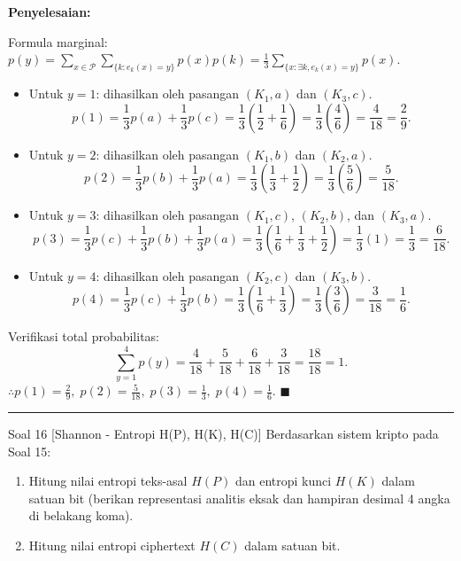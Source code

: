 \documentclass[11pt,a4paper]{article}
\newenvironment{solusi}{\noindent\textbf{\textsf{Penyelesaian:}}\par\vspace{0.2em}}{\hfill$\blacksquare$\vspace{1em}\par\hrule\vspace{1em}}
\begin{document}
\begin{solusi}
Formula marginal: $p(y) = \sum_{x \in \mathcal{P}} \sum_{\{k : e_k(x) = y\}} p(x) p(k) = \frac{1}{3} \sum_{\{x : \exists k, e_k(x)=y\}} p(x)$.
\begin{itemize}[leftmargin=*]
    \item Untuk $y = 1$: dihasilkan oleh pasangan $(K_1, a)$ dan $(K_3, c)$.
    \[
    p(1) = \frac{1}{3} p(a) + \frac{1}{3} p(c) = \frac{1}{3}\left(\frac{1}{2} + \frac{1}{6}\right) = \frac{1}{3}\left(\frac{4}{6}\right) = \frac{4}{18} = \frac{2}{9}.
    \]
    
    \item Untuk $y = 2$: dihasilkan oleh pasangan $(K_1, b)$ dan $(K_2, a)$.
    \[
    p(2) = \frac{1}{3} p(b) + \frac{1}{3} p(a) = \frac{1}{3}\left(\frac{1}{3} + \frac{1}{2}\right) = \frac{1}{3}\left(\frac{5}{6}\right) = \frac{5}{18}.
    \]
    
    \item Untuk $y = 3$: dihasilkan oleh pasangan $(K_1, c)$, $(K_2, b)$, dan $(K_3, a)$.
    \[
    p(3) = \frac{1}{3} p(c) + \frac{1}{3} p(b) + \frac{1}{3} p(a) = \frac{1}{3}\left(\frac{1}{6} + \frac{1}{3} + \frac{1}{2}\right) = \frac{1}{3}(1) = \frac{1}{3} = \frac{6}{18}.
    \]
    
    \item Untuk $y = 4$: dihasilkan oleh pasangan $(K_2, c)$ dan $(K_3, b)$.
    \[
    p(4) = \frac{1}{3} p(c) + \frac{1}{3} p(b) = \frac{1}{3}\left(\frac{1}{6} + \frac{1}{3}\right) = \frac{1}{3}\left(\frac{3}{6}\right) = \frac{3}{18} = \frac{1}{6}.
    \]
\end{itemize}
Verifikasi total probabilitas:
\[
\sum_{y=1}^4 p(y) = \frac{4}{18} + \frac{5}{18} + \frac{6}{18} + \frac{3}{18} = \frac{18}{18} = 1.
\]
$\therefore p(1) = \frac{2}{9}, \; p(2) = \frac{5}{18}, \; p(3) = \frac{1}{3}, \; p(4) = \frac{1}{6}$.
\end{solusi}

\begin{soalshannon}{Soal 16 [Shannon - Entropi H(P), H(K), H(C)]}
Berdasarkan sistem kripto pada Soal 15:
\begin{enumerate}[label=(\alph*)]
    \item Hitung nilai entropi teks-asal $H(P)$ dan entropi kunci $H(K)$ dalam satuan bit (berikan representasi analitis eksak dan hampiran desimal 4 angka di belakang koma).
    \item Hitung nilai entropi ciphertext $H(C)$ dalam satuan bit.
\end{enumerate}
\end{soalshannon}
\end{document}
